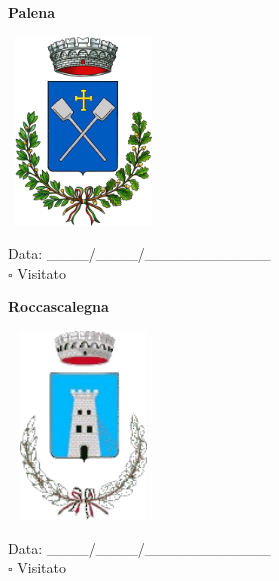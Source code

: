 \documentclass[a5paper,12pt]{article}
\begin{document}
\newpage

\noindent
\begin{minipage}[t]{0.45\textwidth}
    \begin{center}
        \textbf{Palena}
    \end{center}
    \vspace{-0.5cm} %
    \begin{center}
        \includegraphics[height= 5cm, width=4cm]{Abruzzo/Palena-Stemma.png}
    \end{center}
    \vspace{-0.4cm} %
    \begin{flushleft}
        Data: \_\_\_\_/\_\_\_\_/\_\_\_\_\_\_\_\_\_\_\_\_ \\
        $\square$ Visitato
    \end{flushleft}
\end{minipage}
\hfill
\noindent
\begin{minipage}[t]{0.45\textwidth}
    \begin{center}
        \textbf{Roccascalegna}
    \end{center}
    \vspace{-0.5cm} %
    \begin{center}
        \includegraphics[height= 5cm, width=4cm]{Abruzzo/Roccascalegna-Stemma.png}
    \end{center}
    \vspace{-0.4cm} %
    \begin{flushleft}
        Data: \_\_\_\_/\_\_\_\_/\_\_\_\_\_\_\_\_\_\_\_\_ \\
        $\square$ Visitato
    \end{flushleft}
\end{minipage}
\end{document}
